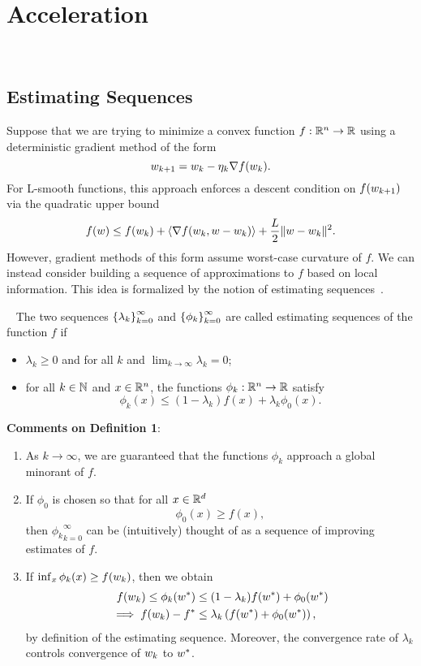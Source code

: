 
\chapter{Acceleration}~\label{ch:acceleration}

\section{Estimating Sequences}

Suppose that we are trying to minimize a convex function \( f : \mathbb{R}^n \rightarrow \mathbb{R} \) using a deterministic gradient method of the form
\[ w_{k+1} = w_k - \eta_k \nabla f(w_k). \]
For L-smooth functions, this approach enforces a descent condition on \( f(w_{k+1}) \) via the quadratic upper bound
\[ f(w) \leq f(w_k) + \left\langle\nabla f(w_k, w - w_k)\right\rangle + \frac{L}{2}\|w - w_k\|^2. \]
However, gradient methods of this form assume worst-case curvature of \( f \).
We can instead consider building a sequence of approximations to \( f \) based on local information.
This idea is formalized by the notion of estimating sequences~\citep{nesterov2004lectures}.\\

\begin{definition}~\label{def:estimating_sequences}
    The two sequences \( \left\{\lambda_k\right\}_{k=0}^\infty \) and \( \left\{\phi_k\right\}_{k=0}^\infty \) are called estimating sequences of the function \( f \) if
    \begin{itemize}
        \item \( \lambda_k \geq 0 \) and for all \( k \) and \( \lim_{k\rightarrow \infty} \lambda_k = 0 \);
        \item for all \( k \in \mathbb{N} \) and \( x \in \mathbb{R}^n \), the functions \( \phi_k: \mathbb{R}^n \rightarrow \mathbb{R} \) satisfy
        \[ \phi_k(x) \leq (1 - \lambda_k) f(x) + \lambda_k \phi_0(x). \]
    \end{itemize}
\end{definition}

\textbf{Comments on Definition 1}:
\begin{enumerate}
    \item As \( k \rightarrow \infty \), we are guaranteed that the functions \( \phi_k \) approach a global minorant of \( f \).
    \item If \( \phi_0 \) is chosen so that for all \( x \in \mathbb{R}^d \)
    \[ \phi_0(x) \geq f(x), \]
    then \( {\phi_k}_{k=0}^\infty \) can be (intuitively) thought of as a sequence of improving estimates of \( f \).
    \item If \( \inf_x \phi_k(x) \geq f(w_k) \), then we obtain
    \begin{align*}
        f(w_k) \leq \phi_k(w^*) &\leq (1 - \lambda_k) f(w^*) + \phi_0(w^*)\\
        \implies f(w_k) - f^* &\leq \lambda_k \left(f(w^*) + \phi_0(w^*)\right),
    \end{align*}
    by definition of the estimating sequence. Moreover, the convergence rate of \( \lambda_k \) controls convergence of \( w_k \) to \( w^* \).\\
\end{enumerate}


